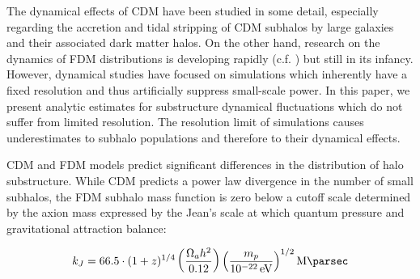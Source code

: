 \documentclass[usenatbib]{mnras}
\newcommand{\poweV}[1]{\SI{e#1}{\electronvolt}}
\begin{document}
\par
        The dynamical effects of CDM have been studied in some detail, especially regarding the accretion and tidal stripping of CDM subhalos by large galaxies and their associated dark matter halos. On the other hand, research on the dynamics of FDM distributions is developing rapidly (c.f. \cite{Schrodinger-Poisson, schive_solitons, Schive-virialized-wave-halos}) but still in its infancy. However, dynamical studies have focused on simulations which inherently have a fixed resolution and thus artificially suppress small-scale power. In this paper, we present analytic estimates for substructure dynamical fluctuations which do not suffer from limited resolution. The resolution limit of simulations causes underestimates to subhalo populations and therefore to their dynamical effects. 
\par 
	CDM and FDM models predict significant differences in the distribution of halo substructure. While CDM predicts a power law divergence in the number of small subhalos, the FDM subhalo mass function is zero below a cutoff scale determined by the axion mass expressed by the Jean’s scale at which quantum pressure and gravitational attraction balance:
\setlength{\belowdisplayskip}{4pt} \setlength{\belowdisplayshortskip}{4pt}
\setlength{\abovedisplayskip}{4pt} \setlength{\abovedisplayshortskip}{4pt}

\begin{equation}
k_J = 66.5 \cdot (1+z)^{1/4} \left( \frac{\Omega_a h^2}{0.12} \right) \left(\frac{m_p}{\poweV{-22}} \right)^{1/2} \si{\per\mega\parsec}
\end{equation}
\end{document}
